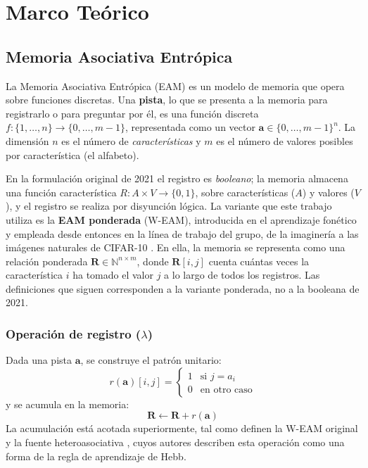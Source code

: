 \chapter{Marco Teórico}
\label{sec:marco_teorico}
\section{Memoria Asociativa Entrópica}
\label{sec:eam}

La Memoria Asociativa Entrópica (EAM) \cite{pineda2021entropic} es un modelo de memoria
que opera sobre funciones discretas.
Una \textbf{pista}, lo que se presenta a la memoria para registrarlo o para preguntar por
él, es una función discreta $f : \{1, \ldots, n\} \to \{0, \ldots, m-1\}$,
representada como un vector $\mathbf{a} \in \{0, \ldots, m-1\}^n$.
La dimensión $n$ es el número de \emph{características} y $m$ es el número de valores posibles
por característica (el alfabeto).

En la formulación original de 2021 el registro es \emph{booleano}; la memoria almacena
una función característica $R : A \times V \to \{0, 1\}$, sobre características ($A$) y
valores ($V$), y el registro se realiza por disyunción lógica.
La variante que este trabajo utiliza es la \textbf{EAM ponderada} (W-EAM), introducida
en el aprendizaje fonético \cite{pineda2022weighted} y empleada desde entonces en la
línea de trabajo del grupo, de la imaginería a las imágenes naturales de
CIFAR-10 \cite{pineda2023imagery,hernandez2026cifar}.
En ella, la memoria se representa como una relación ponderada
$\mathbf{R} \in \mathbb{N}^{n \times m}$, donde $\mathbf{R}[i, j]$ cuenta cuántas veces la característica $i$ ha tomado el valor
$j$ a lo largo de todos los registros.
Las definiciones que siguen corresponden a la variante ponderada, no a la booleana de
2021.

\subsection*{Operación de registro ($\lambda$)}

Dada una pista $\mathbf{a}$, se construye el patrón unitario:
\begin{equation}
    r(\mathbf{a})[i, j] = \begin{cases} 1 & \text{si } j = a_i \\ 0 & \text{en otro caso} \end{cases}
    \label{eq:patron-unitario}
\end{equation}
y se acumula en la memoria:
\begin{equation}
    \mathbf{R} \leftarrow \mathbf{R} + r(\mathbf{a})
    \label{eq:registro}
\end{equation}
La acumulación está acotada superiormente, tal como definen la W-EAM original
\cite{pineda2022weighted} y la fuente heteroasociativa \cite{morales2025missing}, cuyos
autores describen esta operación como una forma de la regla de aprendizaje de Hebb.


